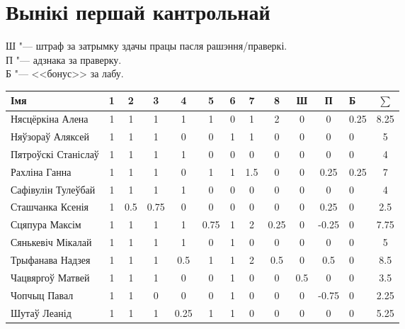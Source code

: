 


	\section{Вынікі першай кантрольнай}
	\noindent Ш "--- штраф за затрымку здачы працы пасля рашэння/праверкі. \\
	П "--- адзнака за праверку. \\
	Б "--- <<бонус>> за лабу.
\begin{table}[H]
	\begin{tabular}{|l|c|c|c|c|c|c|c|c|c|c|l|c|}
		\hline
		Імя                 & 1 & 2   & 3   & 4    & 5    & 6 & 7   & 8    & Ш   & П    & Б    & $\sum$ \\ \hline
		Нясцёркіна Алена    & 1 & 1   & 1   & 1    & 1    & 0 & 1   & 2    & 0   & 0    & 0.25 & 8.25                \\ \hline
		Няўзораў Аляксей    & 1 & 1   & 1   & 0    & 0    & 1 & 1   & 0    & 0   & 0    & 0    & 5                   \\ \hline
		Пятроўскі Станіслаў & 1 & 1   & 1   & 1    & 0    & 0 & 0   & 0    & 0   & 0    & 0    & 4                   \\ \hline
		Рахліна Ганна       & 1 & 1   & 1   & 0    & 1    & 1 & 1.5 & 0    & 0   & 0.25 & 0.25 & 7                   \\ \hline
		Сафівулін Тулеўбай  & 1 & 1   & 1   & 1    & 0    & 0 & 0   & 0    & 0   & 0    & 0    & 4                   \\ \hline
		Сташчанка Ксенія    & 1 & 0.5 & 0.75 & 0    & 0    & 0 & 0   & 0    & 0   & 0.25 & 0    & 2.5                \\ \hline
		Сцяпура Максім      & 1 & 1   & 1   & 1    & 0.75 & 1 & 2   & 0.25 & 0   & -0.25 & 0    & 7.75                 \\ \hline
		Сянькевіч Мікалай   & 1 & 1   & 1   & 1    & 0    & 1 & 0   & 0    & 0   & 0    & 0    & 5                   \\ \hline
		Трыфанава Надзея    & 1 & 1   & 1   & 0.5  & 1    & 1 & 2   & 0.5  & 0   & 0.5  & 0    & 8.5                 \\ \hline
		Чацвяргоў Матвей    & 1 & 1   & 1   & 0    & 0    & 1 & 0   & 0    & 0.5 & 0    & 0    & 3.5                 \\ \hline
		Чопчыц Павал        & 1 & 1   & 0   & 0    & 0    & 1 & 0   & 0    & 0   & -0.75   & 0    & 2.25                   \\ \hline
		Шутаў Леанід        & 1 & 1   & 1   & 0.25 & 1    & 1 & 0   & 0    & 0   & 0    & 0    & 5.25                \\ \hline
	\end{tabular}
\end{table}
	
